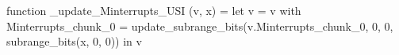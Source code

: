 function _update_Minterrupts_USI (v, x) = let v = { v with Minterrupts_chunk_0 = update_subrange_bits(v.Minterrupts_chunk_0, 0, 0, subrange_bits(x, 0, 0)) } in
  v
